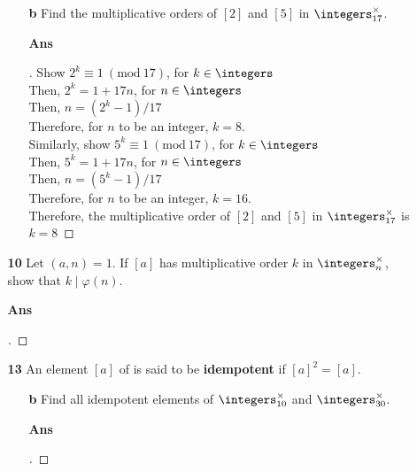 \documentclass[paper=usletter, fontsize=12pt]{article}
\newcommand{\Mod}[1]{\ (\mathrm{mod}\ #1)}
\begin{document}
\begin{itemize}
\begin{itemize}
\begin{itemize}
                \item[\textbf{b}] Find the multiplicative orders of $[2]$ and
                $[5]$ in $\integers_{17}^\times$.
                \item[\textbf{Ans}]
                \begin{proof}[\unskip\nopunct]

                    Show $2^k \equiv 1 \Mod{17}$, for $k \in \integers$\\
                    Then, $2^k = 1 + 17n$, for $n \in \integers$\\
                    Then, $n = (2^k-1)/17$\\
                    Therefore, for $n$ to be an integer, $k = 8$.\\

                    Similarly, show $5^k \equiv 1 \Mod{17}$, for $k \in \integers$\\
                    Then, $5^k = 1 + 17n$, for $n \in \integers$\\
                    Then, $n = (5^k-1)/17$\\
                    Therefore, for $n$ to be an integer, $k = 16$.\\

                    Therefore, the multiplicative order of $[2]$ and $[5]$ in $\integers_{17}^\times$ is $k=8$ \qedhere

                \end{proof}
                \vspace{0.2in}

            \end{itemize}

            \item[\textbf{10}] Let $(a, n)=1$. If $[a]$ has multiplicative
            order $k$ in $\integers_n^\times$, show that $k \mid \varphi(n)$.
            \item[\textbf{Ans}]
            \begin{proof}[\unskip\nopunct]
            \end{proof}
            \vspace{0.2in}

            \item[\textbf{13}] An element $[a]$ of is said to be
            \textbf{idempotent} if $[a]^2=[a]$.
            \begin{itemize}

                \item[\textbf{b}] Find all idempotent elements of
                $\integers_{10}^\times$ and $\integers_{30}^\times$.
                \item[\textbf{Ans}]
                \begin{proof}[\unskip\nopunct]
                \end{proof}
                \vspace{0.2in}


\end{itemize}
\end{itemize}
\end{itemize}
\end{document}
